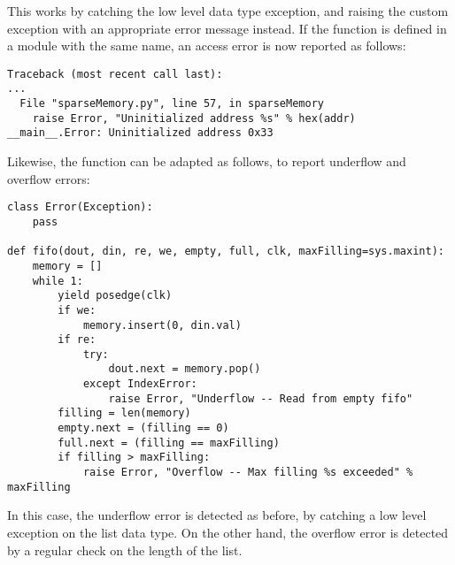 This works by catching the low level data type exception, and raising
the custom exception with an appropriate error message instead.  If
the  function is defined in a module with the
same name, an access error is now reported as follows:

\begin{verbatim}
Traceback (most recent call last):
...
  File "sparseMemory.py", line 57, in sparseMemory
    raise Error, "Uninitialized address %s" % hex(addr)
__main__.Error: Uninitialized address 0x33
\end{verbatim}

Likewise, the  function can be adapted as follows, to
report underflow and overflow errors:

\begin{verbatim}
class Error(Exception):
    pass

def fifo(dout, din, re, we, empty, full, clk, maxFilling=sys.maxint):
    memory = []
    while 1:
        yield posedge(clk)
        if we:
            memory.insert(0, din.val)
        if re:
            try:
                dout.next = memory.pop()
            except IndexError:
                raise Error, "Underflow -- Read from empty fifo"
        filling = len(memory)
        empty.next = (filling == 0)
        full.next = (filling == maxFilling)
        if filling > maxFilling:
            raise Error, "Overflow -- Max filling %s exceeded" % maxFilling
\end{verbatim}

In this case, the underflow error is detected as before, by catching a
low level exception on the list data type. On the other hand, the
overflow error is detected by a regular check on the length of the
list.


